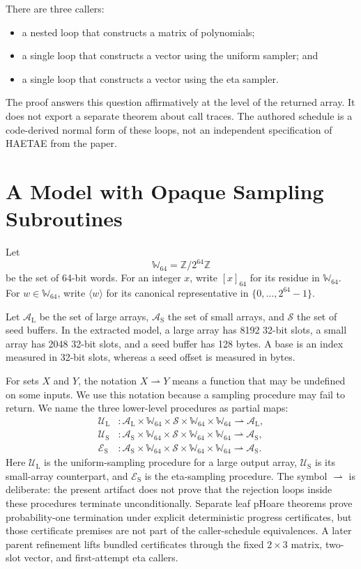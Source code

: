 \documentclass[11pt]{article}
\theoremstyle{definition}
\theoremstyle{plain}
\theoremstyle{remark}
\newcommand{\Z}{\mathbb Z}
\newcommand{\W}{\mathbb W_{64}}
\newcommand{\enc}[1]{\left[#1\right]_{64}}
\newcommand{\uint}[1]{\langle #1\rangle}
\newcommand{\AL}{\mathcal A_{\mathrm L}}
\newcommand{\AS}{\mathcal A_{\mathrm S}}
\newcommand{\Seed}{\mathcal S}
\newcommand{\UL}{\mathcal U_{\mathrm L}}
\newcommand{\US}{\mathcal U_{\mathrm S}}
\newcommand{\ES}{\mathcal E_{\mathrm S}}
\begin{document}
There are three callers:
\begin{itemize}
\item a nested loop that constructs a matrix of polynomials;
\item a single loop that constructs a vector using the uniform sampler; and
\item a single loop that constructs a vector using the eta sampler.
\end{itemize}

The proof answers this question affirmatively at the level of the returned
array.  It does not export a separate theorem about call traces.  The authored
schedule is a code-derived normal form of these loops, not an independent
specification of HAETAE from the paper.

\section{A Model with Opaque Sampling Subroutines}

Let
\[
  \W = \Z/2^{64}\Z
\]
be the set of 64-bit words.  For an integer $x$, write $\enc{x}$ for its
residue in $\W$.  For $w\in\W$, write $\uint{w}$ for its canonical
representative in $\{0,\ldots,2^{64}-1\}$.

Let $\AL$ be the set of large arrays, $\AS$ the set of small arrays, and
$\Seed$ the set of seed buffers.  In the extracted model, a large array has
8192 32-bit slots, a small array has 2048 32-bit slots, and a seed buffer has
128 bytes.  A base is an index measured in 32-bit slots, whereas a seed offset
is measured in bytes.

For sets $X$ and $Y$, the notation $X\rightharpoonup Y$ means a function that
may be undefined on some inputs.  We use this notation because a sampling
procedure may fail to return.  We name the three lower-level procedures as
partial maps:
\begin{align*}
  \UL &: \AL\times\W\times\Seed\times\W\times\W
          \rightharpoonup \AL,\\
  \US &: \AS\times\W\times\Seed\times\W\times\W
          \rightharpoonup \AS,\\
  \ES &: \AS\times\W\times\Seed\times\W\times\W
          \rightharpoonup \AS.
\end{align*}
Here $\UL$ is the uniform-sampling procedure for a large output array, $\US$
is its small-array counterpart, and $\ES$ is the eta-sampling procedure.  The
symbol $\rightharpoonup$ is deliberate: the present artifact does not prove
that the rejection loops inside these procedures terminate unconditionally.
Separate leaf pHoare theorems prove probability-one termination under explicit
deterministic progress certificates, but those certificate premises are not
part of the caller-schedule equivalences.  A later parent refinement lifts
bundled certificates through the fixed \(2\times3\) matrix, two-slot vector,
and first-attempt eta callers.
\end{document}
